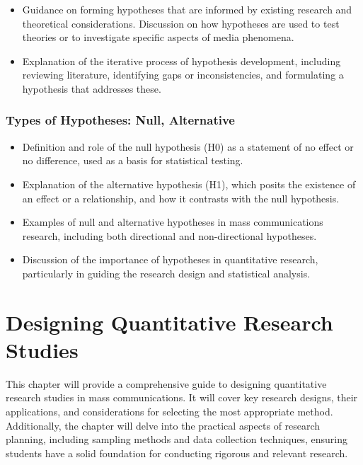 \documentclass[
]{book}
\begin{document}
\begin{itemize}
\item
  Guidance on forming hypotheses that are informed by existing research and theoretical considerations. Discussion on how hypotheses are used to test theories or to investigate specific aspects of media phenomena.
\item
  Explanation of the iterative process of hypothesis development, including reviewing literature, identifying gaps or inconsistencies, and formulating a hypothesis that addresses these.
\end{itemize}

\hypertarget{types-of-hypotheses-null-alternative}{%
\subsection*{Types of Hypotheses: Null, Alternative}\label{types-of-hypotheses-null-alternative}}

\begin{itemize}
\item
  Definition and role of the null hypothesis (H0) as a statement of no effect or no difference, used as a basis for statistical testing.
\item
  Explanation of the alternative hypothesis (H1), which posits the existence of an effect or a relationship, and how it contrasts with the null hypothesis.
\item
  Examples of null and alternative hypotheses in mass communications research, including both directional and non-directional hypotheses.
\item
  Discussion of the importance of hypotheses in quantitative research, particularly in guiding the research design and statistical analysis.
\end{itemize}

\hypertarget{designing-quantitative-research-studies}{%
\chapter*{Designing Quantitative Research Studies}\label{designing-quantitative-research-studies}}

This chapter will provide a comprehensive guide to designing quantitative research studies in mass communications. It will cover key research designs, their applications, and considerations for selecting the most appropriate method. Additionally, the chapter will delve into the practical aspects of research planning, including sampling methods and data collection techniques, ensuring students have a solid foundation for conducting rigorous and relevant research.
\end{document}
